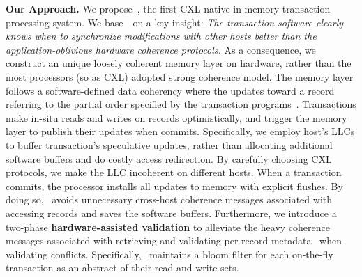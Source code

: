 \ifx\undefined\stale
\noindent \textbf{Our Approach. }
We propose~\name, the first CXL-native in-memory transaction processing system. We base~\name~on a key insight: \textit{The transaction software clearly knows when to synchronize modifications with other hosts better than the application-oblivious hardware coherence protocols.} 
As a consequence, we construct an unique loosely coherent memory layer on hardware, rather than the most processors (so as CXL) adopted strong coherence model. 
The memory layer follows a software-defined data coherency where the updates toward a record referring to the partial order specified by the transaction programs~\cite{TSTM}.
Transactions make in-situ reads and writes on records optimistically, and trigger the memory layer to publish their updates when commits. 
Specifically, we employ host's LLCs to buffer transaction's speculative updates, rather than allocating additional software buffers and do costly access redirection. 
By carefully choosing CXL protocols, we make the LLC incoherent on different hosts. 
When a transaction commits, the processor installs all updates to memory with explicit flushes. 
By doing so, \name~avoids unnecessary cross-host coherence messages associated with accessing records and saves the software buffers. 
Furthermore, we introduce a two-phase \textbf{hardware-assisted validation} to alleviate the heavy coherence messages associated with retrieving and validating per-record metadata~\cite{stm, nvm, distributed-tm} when validating conflicts. Specifically, \name~maintains a bloom filter for each on-the-fly transaction as an abstract of their read and write sets. 
